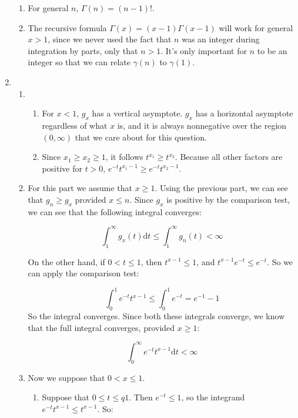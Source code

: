 \begin{enumerate}
\begin{enumerate}
    \item For general $n$, $\Gamma(n) = (n-1)!$.

    \item The recursive formula $\Gamma(x) = (x-1)\Gamma(x-1)$ will work for general $x > 1$, since we never used the fact that $n$ was an integer during integration by parts, only that $n>1$. It's only important for $n$ to be an integer so that we can relate $\gamma(n)$ to $\gamma(1)$. 

    
\end{enumerate}
\item 
    \begin{enumerate}
        \item 
        \begin{enumerate}
            \item For $x<1$, $g_x$ has a vertical asymptote. $g_x$ has a horizontal asymptote regardless of what $x$ is, and it is always nonnegative over the region $(0,\infty)$ that we care about for this question.
            \item  Since $x_1 \geq x_2\geq 1$, it follows $t^{x_1} \geq t^{x_2}$. Because all other factors are positive for $t>0$, $e^{-t}t^{x_1-1} \geq e^{-t}t^{x_2-1}$.
        \end{enumerate}
        \item For this part we assume that $x\geq 1$. Using the previous part, we can see that $g_n\geq g_x$ provided $x\leq n$. Since $g_x$ is positive by the comparison test, we can see that the following integral converges:

        \[
            \int_1^\infty g_x(t) \mathrm dt \leq \int_1^\infty g_n(t) <\infty 
        \]

        On the other hand, if $0< t \leq 1$, then $t^{x-1} \leq 1$, and $t^{x-1}e^{-t} \leq e^{-t}$. So we can apply the comparison test:

        \[
            \int_0^1 e^{-t}t^{x-1} \leq \int_0^1 e^{-t} = e^{-1} - 1
        \]
        So the integral converges. Since both these integrals converge, we know that the full integral converges, provided $x\geq 1$: 

        \[
           \int_0^\infty e^{-t} t^{x-1} \mathrm dt <\infty  
        \]
        
        \item Now we suppose that $0< x \leq 1$. 

        \begin{enumerate}
            \item Suppose that $0\leq t \le q1$. Then $e^{-t}\leq 1$, so the integrand $e^{-t}t^{x-1} \leq t^{x-1}$. So:


\end{enumerate}
\end{enumerate}
\end{enumerate}
